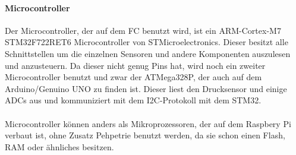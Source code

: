 \documentclass[12pt,a4paper, ngerman]{article}
\begin{document}
\paragraph{Microcontroller}
Der Microcontroller, der auf dem FC benutzt wird, ist ein ARM-Cortex-M7 STM32F722RET6 Microcontroller von STMicroelectronics. Dieser besitzt alle Schnittstellen um die einzelnen Sensoren und andere Komponenten auszulesen und anzusteuern. Da dieser nicht genug Pins hat, wird noch ein zweiter Microcontroller benutzt und zwar der ATMega328P, der auch auf dem Arduino/Genuino UNO zu finden ist. Dieser liest den Drucksensor und einige ADCs aus und kommuniziert mit dem I2C-Protokoll mit dem STM32. \\ \\
Microcontroller können anders als Mikroprozessoren, der auf dem Raspbery Pi verbaut ist, ohne Zusatz Pehpetrie benutzt werden, da sie schon einen Flash, RAM oder ähnliches besitzen. 
\end{document}
